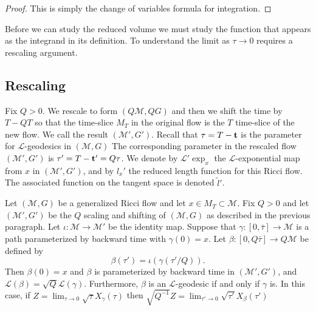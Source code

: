 \begin{proof}
\sketch
This is simply the change of variables formula for integration.
\end{proof}






Before we can study the reduced volume we must study the function
that appears as the integrand in its definition. To understand the
limit as $\tau\rightarrow 0$ requires a rescaling argument.


\subsection{Rescaling}


Fix $Q>0$. We rescale to form $(Q{\mathcal M},QG)$ and then we shift
the time by $T-QT$ so that the time-slice $M_T$ in the original flow
is the $T$ time-slice of the new flow. We call the result
$({\mathcal M}',G')$. Recall that $\tau=T-{\bf t}$ is the parameter
for ${\mathcal L}$-geodesics in $({\mathcal M},G)$ The corresponding
parameter in the rescaled flow $({\mathcal M}',G')$ is $\tau'=T-{\bf
t'}=Q\tau$. We denote by ${\mathcal L}'\exp_x$ the ${\mathcal
L}$-exponential map from $x$ in $({\mathcal M}',G')$, and by $l_x'$
the reduced length function for this Ricci flow. The associated
function on the tangent space is denoted $\tilde l'$.

\begin{lemma}\label{lem:l-length-rescaling}
\label{Lrescale}

Let $({\mathcal M},G)$ be a generalized Ricci flow and let $x\in
M_T\subset {\mathcal M}$. Fix $Q>0$ and let $({\mathcal M}',G')$ be
the $Q$ scaling and shifting of $({\mathcal M},G)$ as described in
the previous paragraph. Let $\iota\colon{\mathcal M}\to {\mathcal
M}'$ be the identity map. Suppose that $\gamma\colon [0,\bar\tau]\to
{\mathcal M}$ is a path parameterized by backward time with
$\gamma(0)=x$. Let $\beta\colon [0,Q\bar\tau]\to Q{\mathcal M}$ be
defined by
$$\beta(\tau')=\iota(\gamma(\tau'/Q)).$$
Then $\beta(0)=x$ and $\beta$ is parameterized by backward time in
$({\mathcal M}',G')$, and ${\mathcal L}(\beta)=\sqrt{Q}{\mathcal
L}(\gamma)$. Furthermore, $\beta$ is an ${\mathcal L}$-geodesic if
and only if $\gamma$ is. In this case, if $Z=\lim_{\tau\rightarrow 0}\sqrt{\tau}X_\gamma(\tau)$ then
$\sqrt{Q^{-1}}Z=\lim_{\tau'\rightarrow
0}\sqrt{\tau'}X_\beta(\tau')$
\end{lemma}

